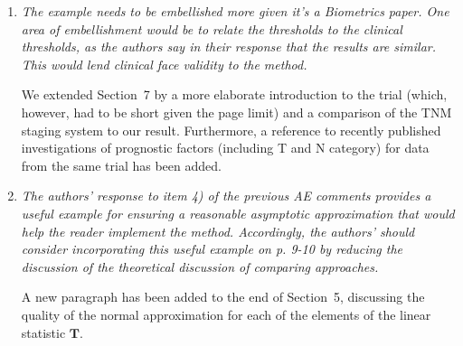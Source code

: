 \documentclass[11pt,a4paper]{article}
\begin{document}
\begin{enumerate}

  \item \textit{The example needs to be embellished more given it's a Biometrics paper. One area of
embellishment would be to relate the thresholds to the clinical thresholds, as the authors
say in their response that the results are similar. This would lend clinical face validity
to the method.}

We extended Section~7 by a more elaborate introduction to the trial (which,
however, had to be short given the page limit) and a comparison of the 
TNM staging system to our result. Furthermore, a reference to recently
published investigations of prognostic factors (including T and N category)
for data from the same trial has been added.

\item \textit{The authors’ response to item 4) of the previous AE comments provides a useful
example for ensuring a reasonable asymptotic approximation that would help the reader
implement the method. Accordingly, the authors’ should consider incorporating this
useful example on p. 9-10 by reducing the discussion of the theoretical discussion of
comparing approaches.}

A new paragraph has been added to the end of Section~5, discussing the
quality of the normal approximation for each of the elements of the
linear statistic $\mathbf{T}$.

\end{enumerate}
\end{document}
